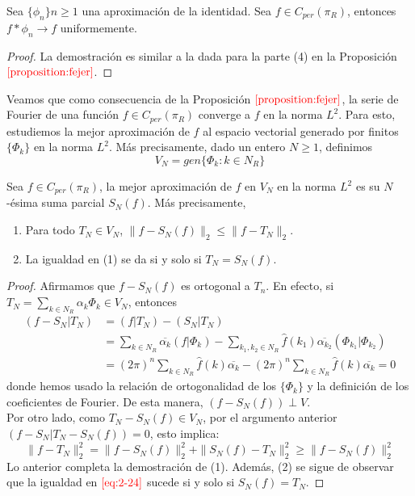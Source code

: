    \begin{proposition}
      Sea $\{\phi_n\}{n \geq 1}$ una aproximación de la identidad. Sea $f \in C_{per}(\pi_R)$, entonces $f*\phi_n \to f$ uniformemente.  
    \end{proposition}
    \begin{proof}
      La demostración es similar a la dada para la parte (4) en la Proposición $\textcolor{red}{\ref{proposition:fejer}}$.
    \end{proof}
    Veamos que como consecuencia de la Proposición $\textcolor{red}{\ref{proposition:fejer}}$, la serie de Fourier de una función $f\in C_{per}(\pi_R)$ converge a $f$ en la norma $L^2$. Para esto, estudiemos la mejor aproximación de $f$ al espacio vectorial generado por finitos $\{\Phi_k\}$  en la norma $L^2$. Más precisamente, dado un entero $N\geq1$, definimos
    \begin{equation}
      V_N=gen\{\Phi_k:k\in N_R\}\label{eq:v_n-2-24}
    \end{equation}
    \begin{proposition}\label{proposition:2-23}
      Sea $f \in C_{per}(\pi_R)$, la mejor aproximación de $f$ en $V_N$ en la norma $L^2$ es su $N$-ésima suma parcial $S_N(f)$. Más precisamente,
      \begin{enumerate}
        \item Para todo $T_N \in V_N$, $\|f - S_N(f)\|_2 \leq \|f - T_N\|_2$.
        \item La igualdad en (1) se da si y solo si $T_N = S_N(f)$.
      \end{enumerate}
    \end{proposition}
    \begin{proof}
      Afirmamos que $f-S_N(f)$ es ortogonal a $T_n$. En efecto, si $T_N=\sum_{k\in N_R}\alpha_k\Phi_k\in V_N$, entonces
      \begin{align*}
        (f-S_N|T_N)&=(f|T_N)-(S_N|T_N)\\
        &=\sum_{k\in N_R}\overline{\alpha_k}(f|\Phi_k)-\sum_{k_1,k_2\in N_R}\hat{f}(k_1)\overline{\alpha_{k_2}}(\Phi_{k_1}|\Phi_{k_2})\\
        &=(2\pi)^n\sum_{k\in N_R}\hat{f}(k)\overline{\alpha_{k}}-(2\pi)^{n}\sum_{k\in N_R}\hat{f}(k)\overline{\alpha_{k}}=0
      \end{align*}
      donde hemos usado la relación de ortogonalidad de los $\{\Phi_k\}$ y la definición de los coeficientes de Fourier. De esta manera, $(f-S_N(f))\perp V$.\\
      Por otro lado, como $T_N-S_N(f) \in V_N$, por el argumento anterior $(f-S_N|T_N-S_N(f))=0$, esto implica:
      \begin{equation}
        \|f-T_N\|_2^{2}=\|f-S_N(f)\|_2^2+\|S_N(f)-T_N\|_2^2\geq \|f-S_N(f)\|_{2}^{2}\label{eq:2-24}  
      \end{equation}
      Lo anterior completa la demostración de (1). Además, (2) se sigue de observar que la igualdad en $\textcolor{red}{\ref{eq:2-24}}$ sucede si y solo si $S_N(f)=T_N$. 
    \end{proof}
